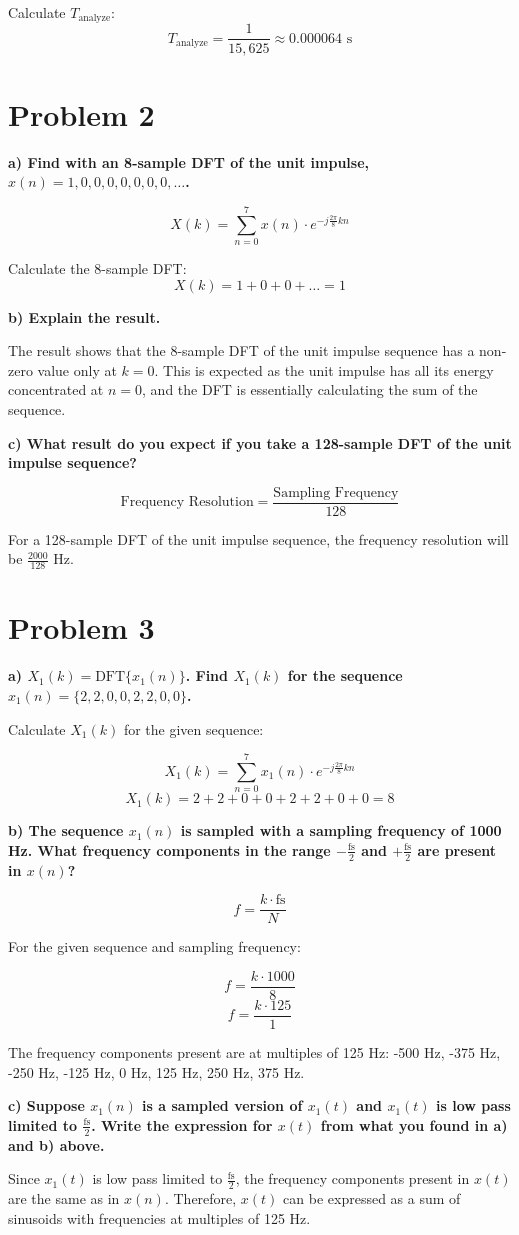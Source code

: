 \documentclass{article}
\begin{document}
Calculate \(T_{\text{analyze}}\):
\[ T_{\text{analyze}} = \frac{1}{15,625} \approx 0.000064 \text{ s} \]

\section*{Problem 2}

\textbf{a) Find with an 8-sample DFT of the unit impulse, \(x(n) = 1, 0, 0, 0, 0, 0, 0, 0, \ldots\).}

\[ X(k) = \sum_{n=0}^{7} x(n) \cdot e^{-j \frac{2\pi}{8}kn} \]

Calculate the 8-sample DFT:
\[ X(k) = 1 + 0 + 0 + \ldots = 1 \]

\textbf{b) Explain the result.}

The result shows that the 8-sample DFT of the unit impulse sequence has a non-zero value only at \(k = 0\). This is expected as the unit impulse has all its energy concentrated at \(n = 0\), and the DFT is essentially calculating the sum of the sequence.

\textbf{c) What result do you expect if you take a 128-sample DFT of the unit impulse sequence?}

\[ \text{Frequency Resolution} = \frac{\text{Sampling Frequency}}{128} \]

For a 128-sample DFT of the unit impulse sequence, the frequency resolution will be \( \frac{2000}{128} \) Hz.

\section*{Problem 3}

\textbf{a) \(X_1(k) = \text{DFT}\{x_1(n)\}\). Find \(X_1(k)\) for the sequence \(x_1(n) = \{2, 2, 0, 0, 2, 2, 0, 0\}\).}

Calculate \(X_1(k)\) for the given sequence:

\[ X_1(k) = \sum_{n=0}^{7} x_1(n) \cdot e^{-j \frac{2\pi}{8}kn} \]
\[ X_1(k) = 2 + 2 + 0 + 0 + 2 + 2 + 0 + 0 = 8 \]

\textbf{b) The sequence \(x_1(n)\) is sampled with a sampling frequency of 1000 Hz. What frequency components in the range \(-\frac{\text{fs}}{2}\) and \(+\frac{\text{fs}}{2}\) are present in \(x(n)\)?}

\[ f = \frac{k \cdot \text{fs}}{N} \]

For the given sequence and sampling frequency:

\[ f = \frac{k \cdot 1000}{8} \]
\[ f = \frac{k \cdot 125}{1} \]

The frequency components present are at multiples of 125 Hz: -500 Hz, -375 Hz, -250 Hz, -125 Hz, 0 Hz, 125 Hz, 250 Hz, 375 Hz.

\textbf{c) Suppose \(x_1(n)\) is a sampled version of \(x_1(t)\) and \(x_1(t)\) is low pass limited to \(\frac{\text{fs}}{2}\). Write the expression for \(x(t)\) from what you found in a) and b) above.}

Since \(x_1(t)\) is low pass limited to \(\frac{\text{fs}}{2}\), the frequency components present in \(x(t)\) are the same as in \(x(n)\). Therefore, \(x(t)\) can be expressed as a sum of sinusoids with frequencies at multiples of 125 Hz.
\end{document}
